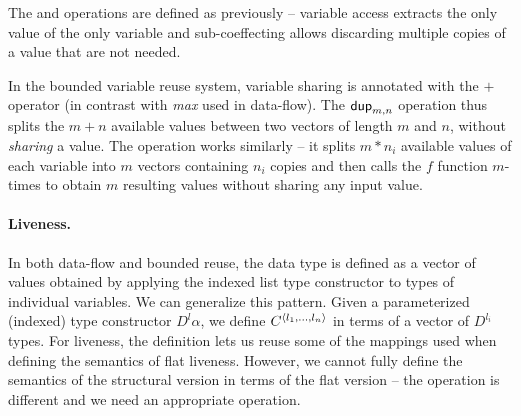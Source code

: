 \noindent
The  and  operations are defined as previously -- variable access 
extracts the only value of the only variable and sub-coeffecting allows discarding multiple
copies of a value that are not needed.

In the bounded variable reuse system, variable sharing is annotated with the $+$ operator (in contrast 
with \textit{max} used in data-flow). The $\textnormal{\sffamily dup}_{m,n}$ operation thus splits the $m+n$ available
values between two vectors of length $m$ and $n$, without \emph{sharing} a value. The 
 operation works similarly -- it splits $m\ast n_i$ available values of each
variable into $m$ vectors containing $n_i$ copies and then calls the $f$ function $m$-times to 
obtain $m$ resulting values without sharing any input value.

\paragraph{Liveness.}
In both data-flow and bounded reuse, the data type is defined as a vector of values obtained
by applying the indexed list type constructor to types of individual variables. We can
generalize this pattern. Given a parameterized (indexed) type constructor $D^l \alpha$, we define 
$\ctyp{\langle l_1, \ldots, l_n \rangle}$ in terms of a vector of $D^{l_i}$ types.
For liveness, the definition lets us reuse some of the mappings used when defining the semantics of
flat liveness. However, we cannot fully define the semantics of the structural version in terms of 
the flat version -- the  operation is different and we need an appropriate 
 operation.

